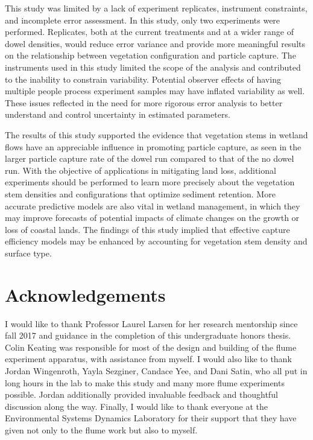 \documentclass[12pt]{article}
\begin{document}
This study was limited by a lack of experiment replicates, instrument constraints, and incomplete error assessment. In this study, only two experiments were performed. Replicates, both at the current treatments and at a wider range of dowel densities, would reduce error variance and provide more meaningful results on the relationship between vegetation configuration and particle capture. The instruments used in this study limited the scope of the analysis and contributed to the inability to constrain variability. Potential observer effects of having multiple people process experiment samples may have inflated variability as well. These issues reflected in the need for more rigorous error analysis to better understand and control uncertainty in estimated parameters.

The results of this study supported the evidence that vegetation stems in wetland flows have an appreciable influence in promoting particle capture, as seen in the larger particle capture rate of the dowel run compared to that of the no dowel run. With the objective of applications in mitigating land loss, additional experiments should be performed to learn more precisely about the vegetation stem densities and configurations that optimize sediment retention. More accurate predictive models are also vital in wetland management, in which they may improve forecasts of potential impacts of climate changes on the growth or loss of coastal lands. The findings of this study implied that effective capture efficiency models may be enhanced by accounting for vegetation stem density and surface type.

\section{Acknowledgements}

I would like to thank Professor Laurel Larsen for her research mentorship since fall 2017 and guidance in the completion of this undergraduate honors thesis. Colin Keating was responsible for most of the design and building of the flume experiment apparatus, with assistance from myself. I would also like to thank Jordan Wingenroth, Yayla Sezginer, Candace Yee, and Dani Satin, who all put in long hours in the lab to make this study and many more flume experiments possible. Jordan additionally provided invaluable feedback and thoughtful discussion along the way. Finally, I would like to thank everyone at the Environmental Systems Dynamics Laboratory for their support that they have given not only to the flume work but also to myself.
\end{document}
